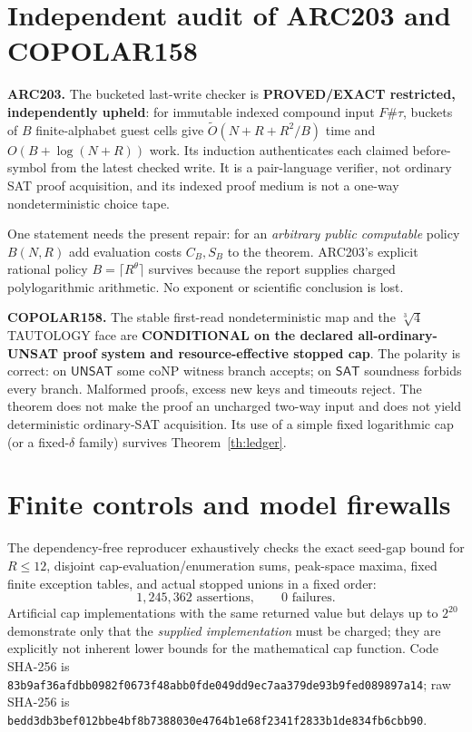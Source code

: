 \documentclass[11pt]{article}
\newcommand{\SAT}{\mathsf{SAT}}
\newcommand{\UNSAT}{\mathsf{UNSAT}}
\begin{document}
\section{Independent audit of ARC203 and COPOLAR158}
\textbf{ARC203.}  The bucketed last-write checker is
\textbf{PROVED/EXACT restricted, independently upheld}: for immutable indexed
compound input $F\#\tau$, buckets of $B$ finite-alphabet guest cells give
$\widetilde O(N+R+R^2/B)$ time and $O(B+\log(N+R))$ work.  Its induction
authenticates each claimed before-symbol from the latest checked write.  It
is a pair-language verifier, not ordinary SAT proof acquisition, and its
indexed proof medium is not a one-way nondeterministic choice tape.

One statement needs the present repair: for an \emph{arbitrary public
computable} policy $B(N,R)$ add evaluation costs $C_B,S_B$ to the theorem.
ARC203's explicit rational policy $B=\lceil R^\theta\rceil$ survives because
the report supplies charged polylogarithmic arithmetic.  No exponent or
scientific conclusion is lost.

\textbf{COPOLAR158.}  The stable first-read nondeterministic map and the
$\sqrt[3]{4}$ TAUTOLOGY face are 
\textbf{CONDITIONAL on the declared all-ordinary-UNSAT proof system and
resource-effective stopped cap}.  The polarity is correct: on $\UNSAT$ some
coNP witness branch accepts; on $\SAT$ soundness forbids every branch.
Malformed proofs, excess new keys and timeouts reject.  The theorem does not
make the proof an uncharged two-way input and does not yield deterministic
ordinary-SAT acquisition.  Its use of a simple fixed logarithmic cap (or a
fixed-$\delta$ family) survives Theorem~\ref{th:ledger}.

\section{Finite controls and model firewalls}
The dependency-free reproducer exhaustively checks the exact seed-gap bound
for $R\le12$, disjoint cap-evaluation/enumeration sums, peak-space maxima,
fixed finite exception tables, and actual stopped unions in a fixed order:
\[
1{,}245{,}362\text{ assertions},\qquad0\text{ failures}.
\]
Artificial cap implementations with the same returned value but delays up
to $2^{20}$ demonstrate only that the \emph{supplied implementation} must be
charged; they are explicitly not inherent lower bounds for the mathematical
cap function.  Code SHA-256 is
\texttt{83b9af36afdbb0982f0673f48abb0fde049dd9ec7aa379de93b9fed089897a14};
raw SHA-256 is
\texttt{bedd3db3bef012bbe4bf8b7388030e4764b1e68f2341f2833b1de834fb6cbb90}.
\end{document}
